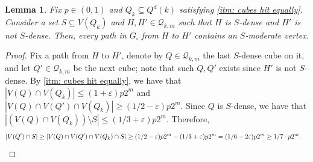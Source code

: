 \documentclass{article}
\newtheorem{lemma}[thm]{Lemma}
\theoremstyle{definition}
\newcommand{\eps}{\varepsilon}
\newcommand{\cQ}{\mathcal{Q}}
\begin{document}
\begin{lemma}\label{lem:cont}
Fix $p\in(0,1)$ and $Q_k\subseteq Q^d(k)$ satisfying \emph{\ref{itm: cubes hit equally}}.
Consider a set $S\subseteq V(Q_k)$ and $H,H'\in\cQ_{k,m}$ such that $H$ is $S$-dense and $H'$ is not $S$-dense. 
Then, every path in $G_{\square}$ from $H$ to $H'$ contains an $S$-moderate vertex.
\end{lemma}
\begin{proof}
Fix a path from $H$ to $H'$, denote by $Q\in \cQ_{k,m}$ the last $S$-dense cube on it, and let $Q'\in\cQ_{k,m}$ be the next cube; note that such $Q,Q'$ exists since $H'$ is not $S$-dense. By \ref{itm: cubes hit equally}, we have that $|V(Q)\cap V(Q_k)|\leq (1+\varepsilon)p2^m$ and $|V(Q)\cap V(Q')\cap V(Q_k)|\geq (1/2-\varepsilon)p2^{m}$. Since $Q$ is $S$-dense, we have that $|(V(Q)\cap V(Q_k))\setminus S|\leq (1/3+\varepsilon)p2^m$. Therefore, 
\begin{align*}
   |V(Q')\cap S|\geq |V(Q)\cap V(Q')\cap V(Q_k)\cap S|\geq (1/2-\eps)p2^m-(1/3+\eps)p2^m=(1/6-2\varepsilon)p2^m\geq 1/7\cdot p2^m. &\qedhere
\end{align*}
\end{proof}
\end{document}
